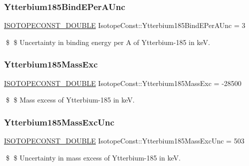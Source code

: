 \subsubsection{\texorpdfstring{Ytterbium185\+Bind\+E\+Per\+A\+Unc}{Ytterbium185BindEPerAUnc}}
{\footnotesize\ttfamily \mbox{\hyperlink{group___isotope_const-_macros_ga8f45a7272ce02c0b4c65c44636ed719a}{I\+S\+O\+T\+O\+P\+E\+C\+O\+N\+S\+T\+\_\+\+D\+O\+U\+B\+LE}} Isotope\+Const\+::\+Ytterbium185\+Bind\+E\+Per\+A\+Unc = 3}

\$ \$ Uncertainty in binding energy per A of Ytterbium-\/185 in keV. \mbox{\label{group___isotope_const-_ytterbium-_yb185_gaf190add31e400df8db3e66be33acfe70}} 
\subsubsection{\texorpdfstring{Ytterbium185\+Mass\+Exc}{Ytterbium185MassExc}}
{\footnotesize\ttfamily \mbox{\hyperlink{group___isotope_const-_macros_ga8f45a7272ce02c0b4c65c44636ed719a}{I\+S\+O\+T\+O\+P\+E\+C\+O\+N\+S\+T\+\_\+\+D\+O\+U\+B\+LE}} Isotope\+Const\+::\+Ytterbium185\+Mass\+Exc = -\/28500}

\$ \$ Mass excess of Ytterbium-\/185 in keV. \mbox{\label{group___isotope_const-_ytterbium-_yb185_ga2a71bc301d617bb8d7353d213d45d3cd}} 
\subsubsection{\texorpdfstring{Ytterbium185\+Mass\+Exc\+Unc}{Ytterbium185MassExcUnc}}
{\footnotesize\ttfamily \mbox{\hyperlink{group___isotope_const-_macros_ga8f45a7272ce02c0b4c65c44636ed719a}{I\+S\+O\+T\+O\+P\+E\+C\+O\+N\+S\+T\+\_\+\+D\+O\+U\+B\+LE}} Isotope\+Const\+::\+Ytterbium185\+Mass\+Exc\+Unc = 503}

\$ \$ Uncertainty in mass excess of Ytterbium-\/185 in keV. \mbox{\label{group___isotope_const-_ytterbium-_yb185_ga4b59826d8e07e45e356f73cd27270b8a}} 
